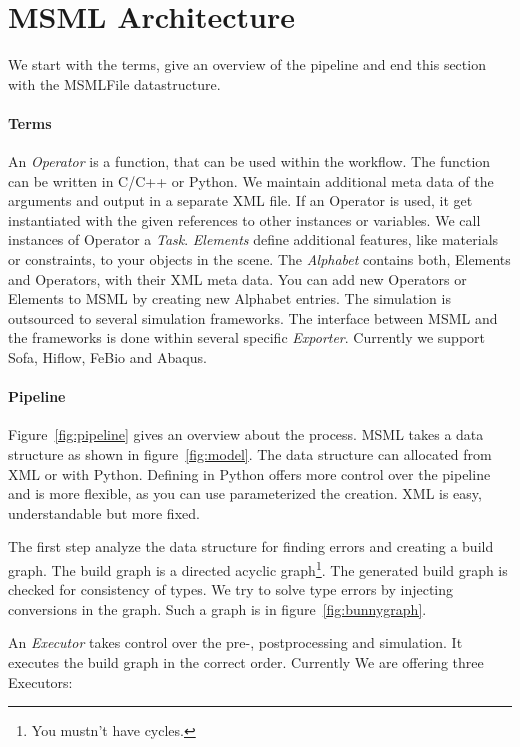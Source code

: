 \section{MSML Architecture}
\label{sec:msml-architecture}

We start with the terms, give an overview of the pipeline and end this
section with the MSMLFile datastructure.

\paragraph{Terms}

An \emph{Operator} is a function, that can be used within the
workflow. The function can be written in C/C++ or Python. We maintain additional
meta data of the arguments and output in a separate XML
file. If an Operator is used, it get instantiated with the given
references to other instances or variables. We call instances of
Operator a \emph{Task}. \emph{Elements} define additional features,
like materials or constraints, to your objects in the scene.
The \emph{Alphabet} contains both, Elements and Operators, with their
XML meta data. You can add new Operators or Elements to MSML by
creating new Alphabet entries. The simulation is outsourced to several
simulation frameworks. The interface between MSML and the frameworks
is done within several specific \emph{Exporter}. Currently we support
Sofa, Hiflow, FeBio and Abaqus.

\paragraph{Pipeline}
\label{sec:pipeline}

Figure~\ref{fig:pipeline} gives an overview about the process.
MSML takes a data structure as shown in figure~\ref{fig:model}.
The data structure can allocated from XML or with Python.
Defining in Python offers more control over the pipeline and is more
flexible, as you can use parameterized the creation.
XML is easy, understandable but more fixed.

The first step analyze the data structure for finding errors and
creating a build graph. The build graph is a directed acyclic
graph\footnote{You mustn't have cycles.}.
The generated build graph is checked for consistency of types.
We try to solve type errors by injecting conversions in the graph.
Such a graph is in figure~\ref{fig:bunnygraph}.

An \emph{Executor} takes control over the  pre-, postprocessing and
simulation. It executes the build graph in the correct
order. Currently We are offering three Executors:

